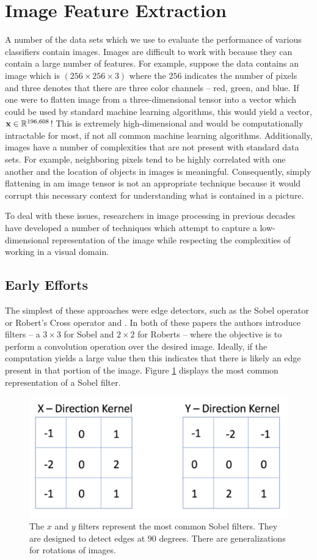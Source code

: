 \documentclass[../thesis.tex]{subfiles}
\begin{document}
\section{Image Feature Extraction}
A number of the data sets which we use to evaluate the performance of various classifiers contain images. Images are difficult to work with because they can contain a large number of features. For example, suppose the data contains an image which is $(256 \times 256 \times 3)$ where the $256$ indicates the number of pixels and three denotes that there are three color channels -- red, green, and blue. If one were to flatten image from a three-dimensional tensor into a vector which could be used by standard machine learning algorithms, this would yield a vector, $\mathbf{x} \in \mathbb{R}^{196,608}$! This is extremely high-dimensional and would be computationally intractable for most, if not all common machine learning algorithms. Additionally, images have a number of complexities that are not present with standard data sets. For example, neighboring pixels tend to be highly correlated with one another and the location of objects in images is meaningful. Consequently, simply flattening in am image tensor is not an appropriate technique because it would corrupt this necessary context for understanding what is contained in a picture. 

To deal with these issues, researchers in image processing in previous decades have developed a number of techniques which attempt to capture a low-dimensional representation of the image while respecting the complexities of working in a visual domain.

\subsection{Early Efforts}
The simplest of these approaches were edge detectors, such as the Sobel operator or Robert's Cross operator \cite{sobel19683x3} and \cite{roberts1963machine}. In both of these papers the authors introduce filters -- a $3 \times 3$ for Sobel and $2 \times 2$ for Roberts -- where the objective is to perform a convolution operation over the desired image. Ideally, if the computation yields a large value then this indicates that there is likely an edge present in that portion of the image. Figure \ref{fig:sobel_filter} displays the most common representation of a Sobel filter.

\begin{figure}
    \centering
    \includegraphics[width=.7\linewidth]{images/sobmasks.pdf}
    \caption[Sobel Filter]{The $x$ and $y$ filters represent the most common Sobel filters. They are designed to detect edges at $90$ degrees. There are generalizations for rotations of images.}
    \label{fig:sobel_filter}
\end{figure}
\end{document}
